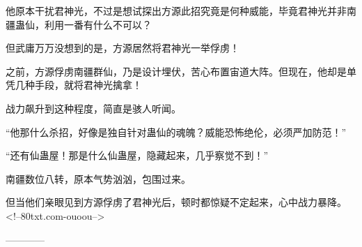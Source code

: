 \begin{this_body}
他原本干扰君神光，不过是想试探出方源此招究竟是何种威能，毕竟君神光并非南疆蛊仙，利用一番有什么不可以？

但武庸万万没想到的是，方源居然将君神光一举俘虏！

之前，方源俘虏南疆群仙，乃是设计埋伏，苦心布置宙道大阵。但现在，他却是单凭几种手段，就将君神光擒拿！

战力飙升到这种程度，简直是骇人听闻。

“他那什么杀招，好像是独自针对蛊仙的魂魄？威能恐怖绝伦，必须严加防范！”

“还有仙蛊屋！那是什么仙蛊屋，隐藏起来，几乎察觉不到！”

南疆数位八转，原本气势汹汹，包围过来。

但当他们亲眼见到方源俘虏了君神光后，顿时都惊疑不定起来，心中战力暴降。<!--80txt.com-ouoou-->

------------

\end{this_body}

